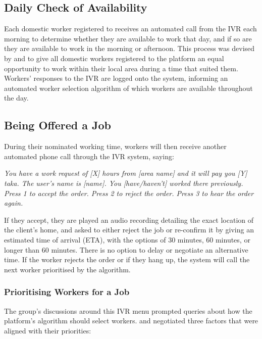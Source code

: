 \subsection{Daily Check of Availability}

Each domestic worker registered to \PC{} receives an automated call from the IVR each morning to determine whether they are available to work that day, and if so are they are available to work in the morning or afternoon. This process was devised by \PC{} and \NGO{} to give all domestic workers registered to the platform an equal opportunity to work within their local area during a time that suited them. Workers' responses to the IVR are logged onto the \PC{} system, informing an automated worker selection algorithm of which workers are available throughout the day. 

\subsection{Being Offered a Job}
\label{sec:JobOffer}

During their nominated working time, workers will then receive another automated phone call through the IVR system, saying:

\begin{displayquote}
\textit{You have a work request of [X] hours from [area name] and it will pay you [Y] taka. The user's name is [name]. You [have/haven't] worked there previously. Press 1 to accept the order. Press 2 to reject the order. Press 3 to hear the order again.}
\end{displayquote}

If they accept, they are played an audio recording detailing the exact location of the client's home, and asked to either reject the job or re-confirm it by giving an estimated time of arrival (ETA), with the options of 30 minutes, 60 minutes, or longer than 60 minutes. There is no option to delay or negotiate an alternative time. If the worker rejects the order or if they hang up, the system will call the next worker prioritised by the algorithm.

\subsubsection{Prioritising Workers for a Job}
The group's discussions around this IVR menu prompted queries about how the platform's algorithm should select workers. \PC{} and \NGO{} negotiated three factors that were aligned with their priorities: 

